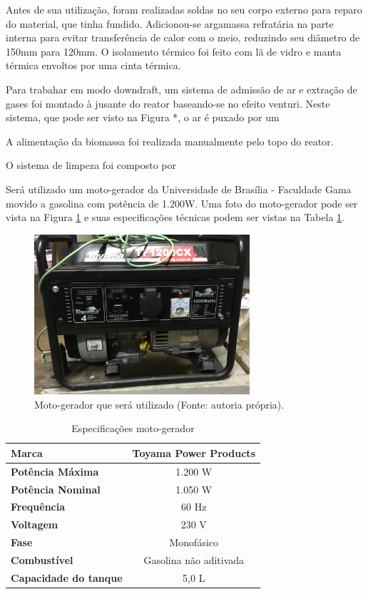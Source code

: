 Antes de sua utilização, foram realizadas soldas no seu corpo externo para reparo do material, que tinha fundido. Adicionou-se argamassa refratária na parte interna para evitar transferência de calor com o meio, reduzindo seu diâmetro de 150mm para 120mm. O isolamento térmico foi feito com lã de vidro e manta térmica envoltos por uma cinta térmica.

Para trabahar em modo downdraft, um sistema de admissão de ar e extração de gases foi montado à jusante do reator baseando-se no efeito venturi. Neste sistema, que pode ser visto na Figura *, o ar é puxado por um 

A alimentação da biomassa foi realizada manualmente pelo topo do reator.

O sistema de limpeza foi composto por 

Será utilizado um moto-gerador da Universidade de Brasília - Faculdade Gama movido a gasolina com potência de 1.200W. Uma foto do moto-gerador pode ser vista na Figura \ref{moto_gerador} e suas especificações técnicas podem ser vistas na Tabela \ref{tabela_motor}.

\begin{figure}[!htb]
	\centering
	\includegraphics[width=8cm]{moto_gerador}

	\caption{Moto-gerador que será utilizado (Fonte: autoria própria).}
	\label{moto_gerador}
\end{figure}

\begin{table}[h]
	\centering
	\caption{Especificações moto-gerador}
	\begin{tabular}{|l|c|}
		\hline
		\textbf{Marca} & Toyama Power Products \\
		\hline
		\textbf{Potência Máxima} & 1.200 W \\
		\hline
		\textbf{Potência Nominal} & 1.050 W \\
		\hline
		\textbf{Frequência} & 60 Hz \\
		\hline
		\textbf{Voltagem} & 230 V \\
		\hline
		\textbf{Fase} & Monofásico \\
		\hline
		\textbf{Combustível} & Gasolina não aditivada \\
		\hline
		\textbf{Capacidade do tanque} & 5,0 L \\
		\hline
	\end{tabular}
	\label{tabela_motor}
\end{table}	


